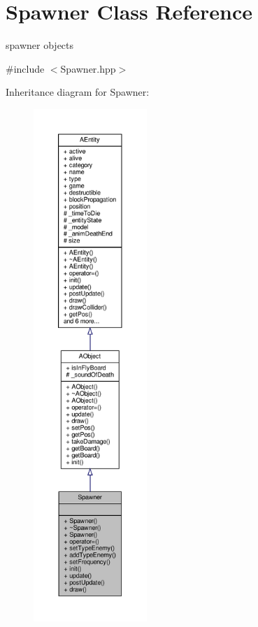 \hypertarget{class_spawner}{}\section{Spawner Class Reference}
\label{class_spawner}


spawner objects  




{\ttfamily \#include $<$Spawner.\+hpp$>$}



Inheritance diagram for Spawner\+:
\nopagebreak
\begin{figure}[H]
\begin{center}
\leavevmode
\includegraphics[height=550pt]{class_spawner__inherit__graph}
\end{center}
\end{figure}


